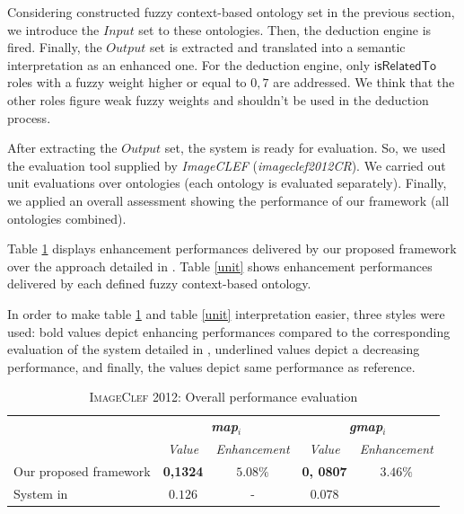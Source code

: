 		Considering constructed fuzzy context-based ontology set in the previous section, 
		we introduce the $Input$ set  to these ontologies. Then, the deduction engine is fired. 
		Finally, the $Output$ set is extracted and translated into a semantic interpretation as an 
		enhanced one. For the deduction engine, only 
		$\mathsf{isRelatedTo}$ roles with a fuzzy weight higher or equal to $0,7$ are addressed. 
		We think that the other roles figure weak fuzzy weights and shouldn't be used in the deduction process.
		
		After extracting the $Output$ set, the system is ready for evaluation. So, we used 
		the evaluation tool supplied by \emph{ImageCLEF} 
		(\emph{imageclef2012CR}). We carried out unit evaluations over ontologies 
		(each ontology is evaluated separately). Finally, we applied an overall assessment showing 
		the performance of our framework (all ontologies combined). 

		Table \ref{overall} displays enhancement performances delivered by our proposed framework over 
		the  approach detailed in \citep{Ksibi2012}. Table \ref{unit} shows enhancement 
		performances delivered by each defined fuzzy context-based ontology.
				

		In order to make table \ref{overall} and table \ref{unit} interpretation easier, three styles 
		were used: bold values depict enhancing performances compared to the corresponding 
		evaluation of the system detailed in \citep{Ksibi2012}, underlined values depict a 
		decreasing performance, and finally, the  values depict same performance 
		as reference. 

		\begin{table}[ht!]
			\centering	
			\caption{\textsc{ImageClef 2012}: Overall performance evaluation}
			\label{overall}
		\begin{tabular}{p{6cm}|c|c|c|c} 
			&
			\multicolumn{2}{c|}{\textbf{\textit{map$_{i}$}}} &
			\multicolumn{2}{c}{\textbf{\textit{gmap$_{i}$}}}  \\
			& \textit{Value} & \textit{Enhancement} & \textit{Value} & \textit{Enhancement}  \\
			\hline  
			Our proposed framework  & 
						\textbf{0,1324} & $5.08 \% $ & 
						\textbf{0, 0807} & $3.46 \% $ \\
			System in \cite{Ksibi2012}   & $0.126$ & - & $0.078$  \\
			\hline 
		\end{tabular}
		\end{table}


